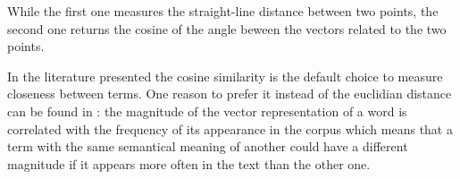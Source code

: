 While the first one measures the straight-line distance between two points, the second one returns the cosine of the angle beween the vectors related to the two points.

In the literature presented the cosine similarity is the default choice to measure closeness between terms.
One reason to prefer it instead of the euclidian distance
can be found in \cite{DBLP:journals/corr/SchakelW15}: the magnitude of the vector representation of a word
is correlated with the frequency of its appearance in the corpus which means that
a term with the same semantical meaning of another could have a different
magnitude if it appears more often in the text than the other one.